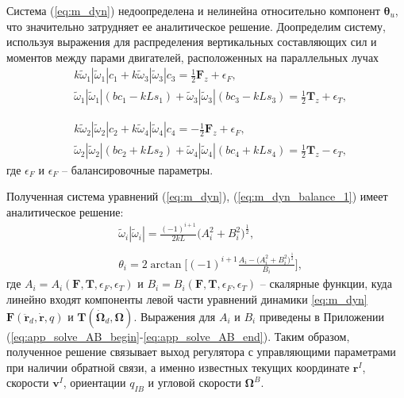 Система (\ref{eq:m_dyn}) недоопределена и нелинейна относительно компонент $\bm \theta_u$, что значительно затрудняет ее аналитическое решение. Доопределим систему, используя выражения для распределения вертикальных составляющих сил и моментов между парами двигателей, расположенных на параллельных лучах
\begin{equation} \label{eq:m_dyn_balance_1}
\begin{aligned}
&k \tilde\omega_1 |\tilde\omega_1| c_1 + k \tilde\omega_3 |\tilde\omega_3| c_3 =
\frac{1}{2} \bm F_z + \epsilon_F,
\\
&\tilde\omega_1 |\tilde\omega_1| (bc_1 - kLs_1)
+ \tilde\omega_3 |\tilde\omega_3| (bc_3 - kLs_3) =
\frac{1}{2} \bm T_z + \epsilon_T,
\end{aligned}
\end{equation}


\begin{equation} \label{eq:m_dyn_balance_2}
\begin{aligned}
&k \tilde\omega_2 |\tilde\omega_2| c_2 + k \tilde\omega_4 |\tilde\omega_4| c_4 =
-\frac{1}{2} \bm F_z + \epsilon_F,
\\
&\tilde\omega_2 |\tilde\omega_2| (bc_2 + kLs_2)
+ \tilde\omega_4 |\tilde\omega_4| (bc_4 + kLs_4) =
\frac{1}{2} \bm T_z - \epsilon_T,
\end{aligned}
\end{equation}
где $\epsilon_F$ и $\epsilon_F$ -- балансировочные параметры.

Полученная система уравнений (\ref{eq:m_dyn}), (\ref{eq:m_dyn_balance_1}) имеет аналитическое решение:
\begin{equation} \label{eq:m_dyn_resolve}
\begin{aligned}
&\tilde\omega_i |\tilde\omega_i| =
\frac{(-1)^{i+1}}{2kL}\Big(
A^2_i + 
B^2_i
\Big)^{\frac{1}{2}},
\\
\phantom{}
\\
&\theta_i = 
2 \arctan \Bigg[(-1)^{i+1}	
\frac{A_i -
\Big(A^2_i +
B^2_i
\Big)^{\frac{1}{2}}}
{B_i}
\Bigg],
\end{aligned}
\end{equation}
где $A_i = A_i(\bm F, \bm T, \epsilon_F, \epsilon_T)$
и
$B_i = B_i(\bm F, \bm T, \epsilon_F, \epsilon_T)$
-- скалярные функции, куда линейно входят компоненты левой части уравнений динамики \eqref{eq:m_dyn}
$\bm F(\ddot{\bm r}_d, \dot{\bm r}, q)$
и
$\bm T(\dot{\bm \Omega}_d, \bm\Omega)$.
Выражения для $A_i$ и $B_i$ приведены в Приложении
(\ref{eq:app_solve_AB_begin}-\ref{eq:app_solve_AB_end}).
Таким образом, полученное решение связывает выход регулятора с управляющими параметрами при наличии обратной связи, а именно известных текущих координате $\bm r^I$, скорости $\bm v^I$, ориентации $q_{IB}$ и угловой скорости $\bm \Omega^B$.

